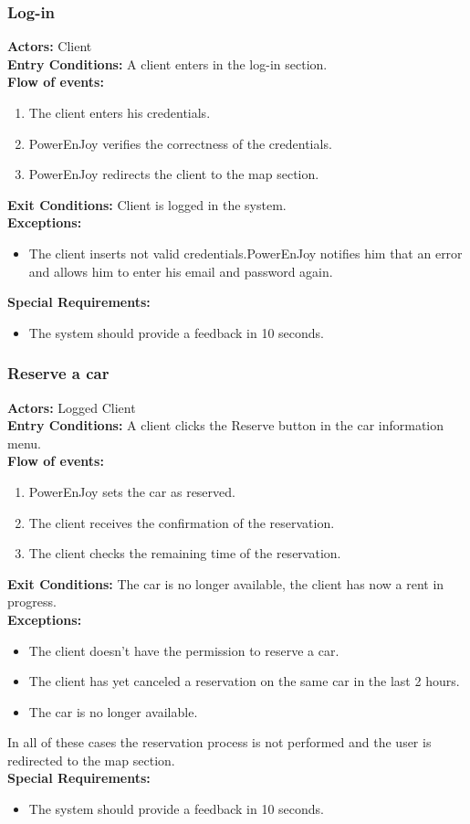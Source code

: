 \subsubsection{Log-in}
%
\textbf{Actors:}
Client\\
%
\textbf{Entry Conditions:}
A client enters in the log-in section.\\
%
\textbf{Flow of events:}
\begin{enumerate}
\item The client enters his credentials.
\item PowerEnJoy verifies the correctness of the credentials.
\item PowerEnJoy redirects the client to the map section.
\end{enumerate}
%
\textbf{Exit Conditions:}
Client is logged in the system.\\
%
\textbf{Exceptions:}
\begin{itemize}
\item The client inserts not valid credentials.PowerEnJoy notifies him that an error and allows him to enter his email and password again.
\end{itemize}
%
\textbf{Special Requirements:}
\begin{itemize}
\item The system should provide a feedback in 10 seconds.
\end{itemize}


\subsubsection{Reserve a car}
%
\textbf{Actors:}
Logged Client\\
%
\textbf{Entry Conditions:}
A client clicks the Reserve button in the car information menu.\\
%
\textbf{Flow of events:}
\begin{enumerate}
\item PowerEnJoy sets the car as reserved.
\item The client receives the confirmation of the reservation.
\item The client checks the remaining time of the reservation.  
\end{enumerate}
%
\textbf{Exit Conditions:}
The car is no longer available, the client has now a rent in progress.\\
%
\textbf{Exceptions:}
\begin{itemize}
\item The client doesn't have the permission to reserve a car.
\item The client has yet canceled a reservation on the same car in the last 2 hours. 
\item The car is no longer available.
\end{itemize}
In all of these cases the reservation process is not performed and the user is redirected to the map section. \\
%
\textbf{Special Requirements:}
\begin{itemize}
\item The system should provide a feedback in 10 seconds.
\end{itemize}


